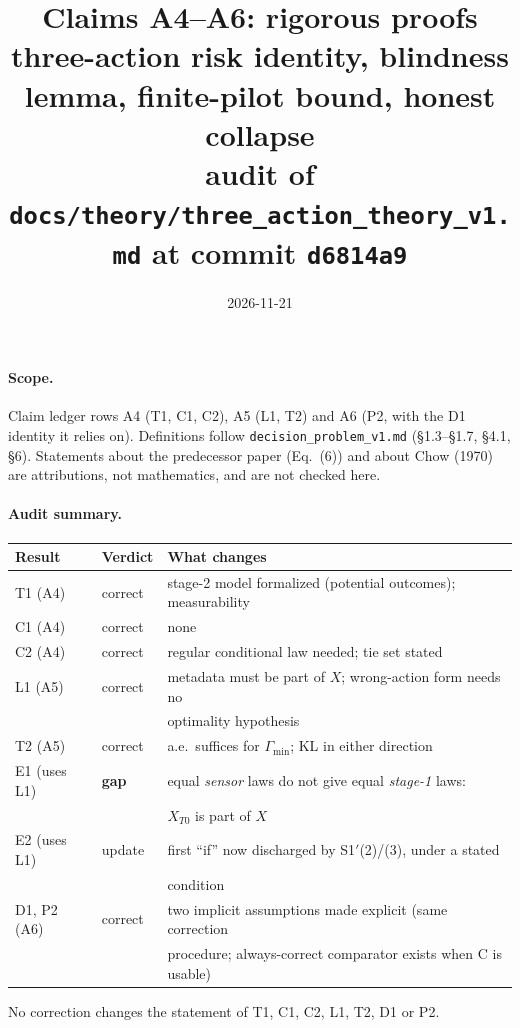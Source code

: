 \documentclass[11pt,a4paper]{article}
\title{Claims A4--A6: rigorous proofs\\[2pt]
\large three-action risk identity, blindness lemma, finite-pilot bound, honest collapse\\
\normalsize audit of \texttt{docs/theory/three\_action\_theory\_v1.md} at commit \texttt{d6814a9}}
\date{2026-11-21}
\author{}
\theoremstyle{definition}
\theoremstyle{remark}
\begin{document}
\maketitle

\paragraph{Scope.} Claim ledger rows A4 (T1, C1, C2), A5 (L1, T2) and A6 (P2, with the
D1 identity it relies on). Definitions follow \texttt{decision\_problem\_v1.md}
(§1.3--§1.7, §4.1, §6). Statements about the predecessor paper (Eq.~(6)) and about
Chow (1970) are attributions, not mathematics, and are not checked here.

\paragraph{Audit summary.}
\begin{center}
\begin{tabular}{@{}lll@{}}
\toprule
Result & Verdict & What changes \\
\midrule
T1 (A4) & correct & stage-2 model formalized (potential outcomes); measurability\\
C1 (A4) & correct & none\\
C2 (A4) & correct & regular conditional law needed; tie set stated\\
L1 (A5) & correct & metadata must be part of $X$; wrong-action form needs no\\
& & optimality hypothesis\\
T2 (A5) & correct & a.e.\ suffices for $\Gamma_{\min}$; KL in either direction\\
E1 (uses L1) & \textbf{gap} & equal \emph{sensor} laws do not give equal \emph{stage-1} laws:\\
& & $X_{T0}$ is part of $X$\\
E2 (uses L1) & update & first ``if'' now discharged by S1$'$(2)/(3), under a stated\\
& & condition\\
D1, P2 (A6) & correct & two implicit assumptions made explicit (same correction\\
& & procedure; always-correct comparator exists when C is usable)\\
\bottomrule
\end{tabular}
\end{center}
No correction changes the statement of T1, C1, C2, L1, T2, D1 or P2.

\end{document}
